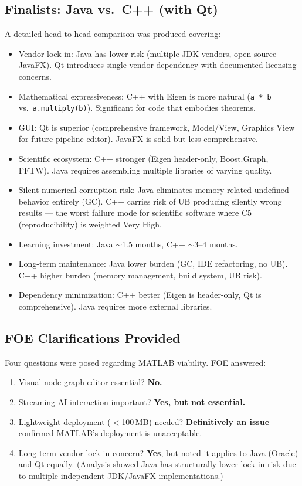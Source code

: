 \documentclass[11pt,a4paper]{article}
\begin{document}
\subsection{Finalists: Java vs.\ C++ (with Qt)}

A detailed head-to-head comparison was produced covering:

\begin{itemize}
    \item Vendor lock-in: Java has lower risk (multiple JDK vendors, open-source JavaFX). Qt introduces single-vendor dependency with documented licensing concerns.
    \item Mathematical expressiveness: C++ with Eigen is more natural (\texttt{a * b} vs.\ \texttt{a.multiply(b)}). Significant for code that embodies theorems.
    \item GUI: Qt is superior (comprehensive framework, Model/View, Graphics View for future pipeline editor). JavaFX is solid but less comprehensive.
    \item Scientific ecosystem: C++ stronger (Eigen header-only, Boost.Graph, FFTW). Java requires assembling multiple libraries of varying quality.
    \item Silent numerical corruption risk: Java eliminates memory-related undefined behavior entirely (GC). C++ carries risk of UB producing silently wrong results --- the worst failure mode for scientific software where C5 (reproducibility) is weighted Very High.
    \item Learning investment: Java $\sim$1.5 months, C++ $\sim$3--4 months.
    \item Long-term maintenance: Java lower burden (GC, IDE refactoring, no UB). C++ higher burden (memory management, build system, UB risk).
    \item Dependency minimization: C++ better (Eigen is header-only, Qt is comprehensive). Java requires more external libraries.
\end{itemize}

\subsection{FOE Clarifications Provided}

Four questions were posed regarding MATLAB viability. FOE answered:

\begin{enumerate}
    \item Visual node-graph editor essential? \textbf{No.}
    \item Streaming AI interaction important? \textbf{Yes, but not essential.}
    \item Lightweight deployment ($<$100\,MB) needed? \textbf{Definitively an issue} --- confirmed MATLAB's deployment is unacceptable.
    \item Long-term vendor lock-in concern? \textbf{Yes}, but noted it applies to Java (Oracle) and Qt equally. (Analysis showed Java has structurally lower lock-in risk due to multiple independent JDK/JavaFX implementations.)
\end{enumerate}
\end{document}
